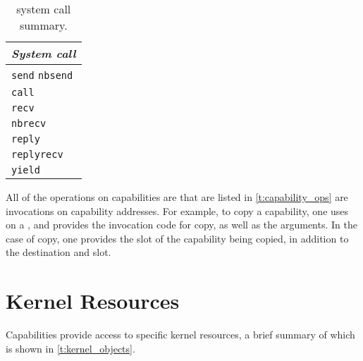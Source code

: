 \begin{table} 
    \centering
    \begin{tabular}{l}\toprule
        \emph{System call} \\\midrule
        \texttt{send} 
        \texttt{nbsend}    \\
        \texttt{call}      \\
        \texttt{recv}      \\
        \texttt{nbrecv}    \\
        \texttt{reply}     \\
        \texttt{replyrecv} \\
        \texttt{yield}     \\
        \bottomrule
    \end{tabular}
    \caption{\selfour system call summary.}
    \label{t:system-calls}
\end{table}

All of the operations on capabilities are that are listed in \cref{t:capability_ops} are invocations
on  capability addresses. For example, to copy a capability, one uses  on a
, and provides the invocation code for copy, as well as the arguments. In the case of
copy, one provides the slot of the capability being copied, in addition to the destination
 and
slot. 

\section{Kernel Resources}

Capabilities provide access to specific kernel resources, a brief summary of which is shown in
\cref{t:kernel_objects}. 


